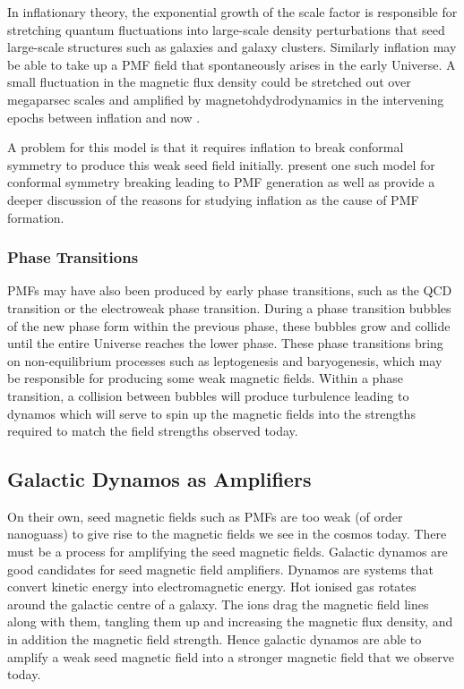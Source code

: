 In inflationary theory, the exponential growth of the scale factor is responsible for stretching quantum fluctuations into large-scale density perturbations that seed large-scale structures such as galaxies and galaxy clusters. Similarly inflation may be able to take up a PMF field that spontaneously arises in the early Universe. A small fluctuation in the magnetic flux density could be stretched out over megaparsec scales and amplified by magnetohdydrodynamics in the intervening epochs between inflation and now \cite{PhysRevD.37.2743}.

A problem for this model is that it requires inflation to break conformal symmetry to produce this weak seed field initially. \cite{PhysRevD.37.2743} present one such model for conformal symmetry breaking leading to PMF generation as well as provide a deeper discussion of the reasons for studying inflation as the cause of PMF formation.
\\
\subsubsection{Phase Transitions}
PMFs may have also been produced by early phase transitions, such as the QCD transition or the electroweak phase transition. During a phase transition bubbles of the new phase form within the previous phase, these bubbles grow and collide until the entire Universe reaches the lower phase. These phase transitions bring on non-equilibrium processes such as leptogenesis and baryogenesis, which may be responsible for producing some weak magnetic fields. Within a phase transition, a collision between bubbles will produce turbulence leading to dynamos which will serve to spin up the magnetic fields into the strengths required to match the field strengths observed today.

\subsection{Galactic Dynamos as Amplifiers}
On their own, seed magnetic fields such as PMFs are too weak (of order nanoguass) to give rise to the magnetic fields we see in the cosmos today. There must be a process for amplifying the seed magnetic fields. Galactic dynamos are good candidates for seed magnetic field amplifiers. Dynamos are systems that convert kinetic energy into electromagnetic energy. Hot ionised gas rotates around the galactic centre of a galaxy. The ions drag the magnetic field lines along with them, tangling them up and increasing the magnetic flux density, and in addition the magnetic field strength. Hence galactic dynamos are able to amplify a weak seed magnetic field into a stronger magnetic field that we observe today.

